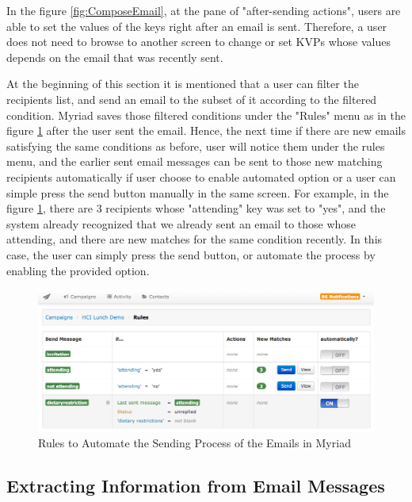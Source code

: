 In the figure \ref{fig:ComposeEmail}, at the pane of "after-sending actions", users are able to set the values of the keys right after an email is sent. Therefore, a user does not need to browse to another screen to change or set \ac{KVP}s whose values depends on the email that was recently sent.
\vspace{1cm}

At the beginning of this section it is mentioned that a user can filter the recipients list, and send an email to the subset of it according to the filtered condition. Myriad saves those filtered conditions under the "Rules" menu as in the figure \ref{fig:AutomatedRules} after the user sent the email. Hence, the next time if there are new emails satisfying the same conditions as before, user will notice them under the rules menu, and the earlier sent email messages can be sent to those new matching recipients automatically if user choose to enable automated option or a user can simple press the send button manually in the same screen. For example, in the figure \ref{fig:AutomatedRules}, there are 3 recipients whose "attending" key was set to "yes", and the system already recognized that we already sent an email to those whose attending, and there are new matches for the same condition recently. In this case, the user can simply press the send button, or automate the process by enabling the provided option.

\clearpage

\begin{figure}[htbp]
	\centering
	\includegraphics[width=1.00\textwidth]{imgs/AutomatedRules.png}
	\caption[Rules to Automate the Sending Process of the Emails in Myriad]{Rules to Automate the Sending Process of the Emails in Myriad}
	\label{fig:AutomatedRules}
\end{figure}

\subsection{Extracting Information from Email Messages}
\label{subsec:5.2.5:ExtrInfoEmaiMess}

